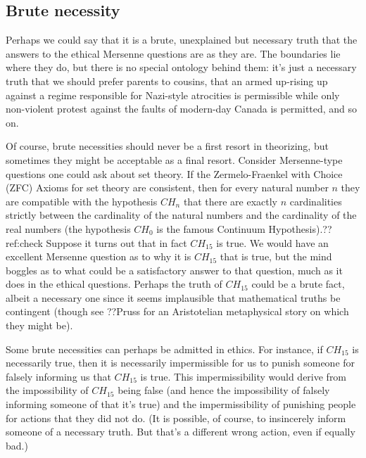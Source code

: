 \subsection{Brute necessity}
Perhaps we could say that it is a brute, unexplained but necessary truth that the answers to the ethical Mersenne questions are as they are.
The boundaries lie where they do, but there is no special ontology behind them: it's just a necessary truth that we should prefer parents to cousins,
that an armed up-rising up against a regime responsible for Nazi-style atrocities is permissible while only non-violent protest against the
faults of modern-day Canada is permitted, and so on. 

Of course, brute necessities should never be a first resort in theorizing, but sometimes they might be acceptable as a final resort. Consider
Mersenne-type questions one could ask about set theory. If the Zermelo-Fraenkel with Choice (ZFC) Axioms for set theory are consistent, then for every natural number
$n$ they are compatible with the hypothesis $CH_n$ that there are exactly $n$ cardinalities strictly between the cardinality of the natural numbers and
the cardinality of the real numbers (the hypothesis $CH_0$ is the famous Continuum Hypothesis).??ref:check Suppose it turns out that in fact $CH_{15}$ is true.
We would have an excellent Mersenne question as to why it is $CH_{15}$ that is true, but the mind boggles as to what could be a satisfactory answer to that
question, much as it does in the ethical questions. Perhaps the truth of $CH_{15}$ could be a brute fact, albeit a necessary one since it seems implausible
that mathematical truths be contingent (though see ??Pruss for an Aristotelian metaphysical story on which they might be). 

Some brute necessities can perhaps be admitted in ethics. For instance, if $CH_{15}$ is necessarily true, then it is necessarily impermissible 
for us to punish someone for falsely informing us that $CH_{15}$ is true. This impermissibility would derive from the impossibility of $CH_{15}$ being
false (and hence the impossibility of falsely informing someone of that it's true) and the impermissibility of punishing people for actions that they did not 
do. (It is possible, of course, to insincerely inform someone of a necessary truth. But that's a different wrong action, even if equally bad.) 

